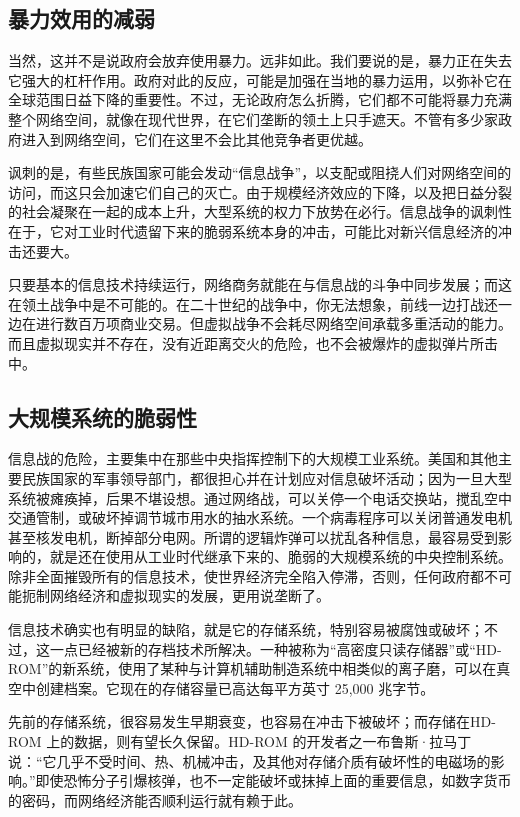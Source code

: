 \subsection{暴力效用的减弱}
当然，这并不是说政府会放弃使用暴力。远非如此。我们要说的是，暴力正在失去它强大的杠杆作用。政府对此的反应，可能是加强在当地的暴力运用，以弥补它在全球范围日益下降的重要性。不过，无论政府怎么折腾，它们都不可能将暴力充满整个网络空间，就像在现代世界，在它们垄断的领土上只手遮天。不管有多少家政府进入到网络空间，它们在这里不会比其他竞争者更优越。

讽刺的是，有些民族国家可能会发动“信息战争”，以支配或阻挠人们对网络空间的访问，而这只会加速它们自己的灭亡。由于规模经济效应的下降，以及把日益分裂的社会凝聚在一起的成本上升，大型系统的权力下放势在必行。信息战争的讽刺性在于，它对工业时代遗留下来的脆弱系统本身的冲击，可能比对新兴信息经济的冲击还要大。

只要基本的信息技术持续运行，网络商务就能在与信息战的斗争中同步发展；而这在领土战争中是不可能的。在二十世纪的战争中，你无法想象，前线一边打战还一边在进行数百万项商业交易。但虚拟战争不会耗尽网络空间承载多重活动的能力。而且虚拟现实并不存在，没有近距离交火的危险，也不会被爆炸的虚拟弹片所击中。

\subsection{大规模系统的脆弱性}
信息战的危险，主要集中在那些中央指挥控制下的大规模工业系统。美国和其他主要民族国家的军事领导部门，都很担心并在计划应对信息破坏活动；因为一旦大型系统被瘫痪掉，后果不堪设想。通过网络战，可以关停一个电话交换站，搅乱空中交通管制，或破坏掉调节城市用水的抽水系统。一个病毒程序可以关闭普通发电机甚至核发电机，断掉部分电网。所谓的逻辑炸弹可以扰乱各种信息，最容易受到影响的，就是还在使用从工业时代继承下来的、脆弱的大规模系统的中央控制系统。除非全面摧毁所有的信息技术，使世界经济完全陷入停滞，否则，任何政府都不可能扼制网络经济和虚拟现实的发展，更用说垄断了。

信息技术确实也有明显的缺陷，就是它的存储系统，特别容易被腐蚀或破坏；不过，这一点已经被新的存档技术所解决。一种被称为“高密度只读存储器”或“HD-ROM”的新系统，使用了某种与计算机辅助制造系统中相类似的离子磨，可以在真空中创建档案。它现在的存储容量已高达每平方英寸 25,000 兆字节。

先前的存储系统，很容易发生早期衰变，也容易在冲击下被破坏；而存储在HD-ROM 上的数据，则有望长久保留。HD-ROM 的开发者之一布鲁斯·拉马丁说：“它几乎不受时间、热、机械冲击，及其他对存储介质有破坏性的电磁场的影响。”即使恐怖分子引爆核弹，也不一定能破坏或抹掉上面的重要信息，如数字货币的密码，而网络经济能否顺利运行就有赖于此。

